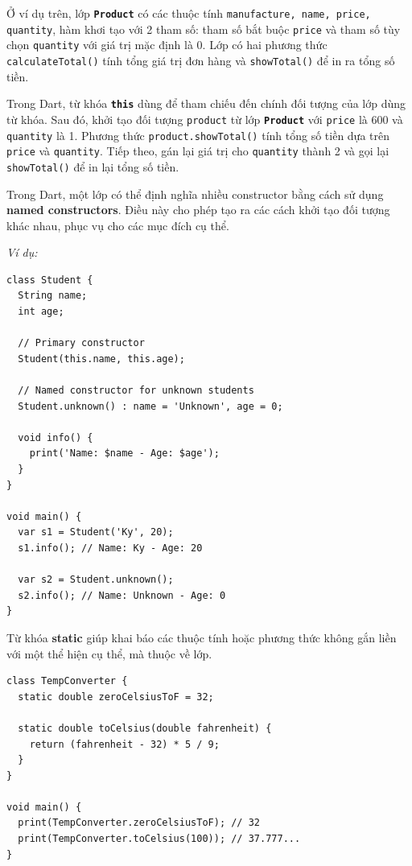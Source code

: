\documentclass[../DoAn.tex]{subfiles}
\numberwithin{figure}{chapter}
\begin{document}
Ở ví dụ trên, lớp \texttt{\textbf{Product}} có các thuộc tính \texttt{manufacture, name, price, quantity}, hàm khơi tạo với 2 tham số: tham số bắt buộc \texttt{price} và tham số tùy chọn \texttt{quantity} với giá trị mặc định là 0. Lớp có hai phương thức \\ \texttt{calculateTotal()} tính tổng giá trị đơn hàng và \texttt{showTotal()} để in ra tổng số tiền.

Trong Dart, từ khóa \textbf{\texttt{this}} dùng để tham chiếu đến chính đối tượng của lớp dùng từ khóa.
Sau đó, khởi tạo đối tượng \texttt{product} từ lớp \textbf{\texttt{Product}} với \texttt{price} là 600 và \texttt{quantity} là 1. Phương thức \texttt{product.showTotal()} tính tổng số tiền dựa trên \texttt{price} và \texttt{quantity}. Tiếp theo, gán lại giá trị cho \texttt{quantity} thành 2 và gọi lại \texttt{showTotal()} để in lại tổng số tiền. 

Trong Dart, một lớp có thể định nghĩa nhiều constructor bằng cách sử dụng \textbf{named constructors}. Điều này cho phép tạo ra các cách khởi tạo đối tượng khác nhau, phục vụ cho các mục đích cụ thể. 

\textit{Ví dụ:}
\begin{lstlisting}
class Student {
  String name;
  int age;

  // Primary constructor
  Student(this.name, this.age);

  // Named constructor for unknown students
  Student.unknown() : name = 'Unknown', age = 0;

  void info() {
    print('Name: $name - Age: $age');
  }
}

void main() {
  var s1 = Student('Ky', 20);
  s1.info(); // Name: Ky - Age: 20

  var s2 = Student.unknown();
  s2.info(); // Name: Unknown - Age: 0
}
\end{lstlisting}

Từ khóa \textbf{static} giúp khai báo các thuộc tính hoặc phương thức không gắn liền với một thể hiện cụ thể, mà thuộc về lớp.

\begin{lstlisting}
class TempConverter {
  static double zeroCelsiusToF = 32;

  static double toCelsius(double fahrenheit) {
    return (fahrenheit - 32) * 5 / 9;
  }
}

void main() {
  print(TempConverter.zeroCelsiusToF); // 32
  print(TempConverter.toCelsius(100)); // 37.777...
}
\end{lstlisting}
\end{document}
